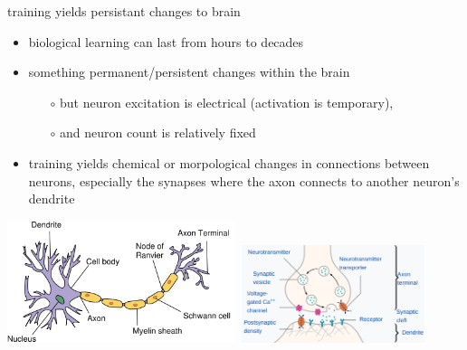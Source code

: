 \documentclass[xcolor={svgnames},
               hyperref={colorlinks,citecolor=DeepPink4,linkcolor=FireBrick,urlcolor=Maroon}]
               {beamer}
\begin{document}
\begin{frame}{training yields persistant changes to brain}

\begin{itemize}
\item biological learning can last from hours to decades
\item something permanent/persistent changes within the brain
    \begin{itemize}
    \item[$\circ$] but neuron excitation is electrical (activation is temporary),
    \item[$\circ$] and neuron count is relatively fixed
    \end{itemize}
\item training yields chemical or morpological changes in connections between neurons, especially the \alert{synapses} where the axon connects to another neuron's dendrite
\end{itemize}

\begin{center}
\mbox{\includegraphics[width=0.5\textwidth]{figs/physicalneuron} \includegraphics[width=0.4\textwidth]{figs/synapse}}
\end{center}
\end{frame}
\end{document}
